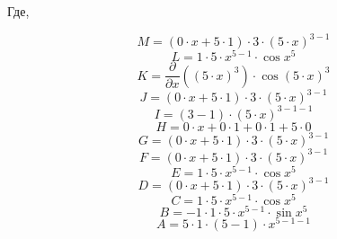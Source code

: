 \documentclass[12pt]{article}
\begin{document}
Где, 

\begin{equation}
	M = 
\left( 0\cdot x + 5\cdot 1\right) \cdot 3\cdot \left( 5\cdot x\right) ^{3 - 1}
\end{equation}
\begin{equation}
	L = 
1\cdot 5\cdot x^{5 - 1}\cdot \cos {x^{5}}
\end{equation}
\begin{equation}
	K = 
\frac{\partial}{\partial x}\left( \left( 5\cdot x\right) ^{3}\right) \cdot \cos {\left( 5\cdot x\right) ^{3}}
\end{equation}
\begin{equation}
	J = 
\left( 0\cdot x + 5\cdot 1\right) \cdot 3\cdot \left( 5\cdot x\right) ^{3 - 1}
\end{equation}
\begin{equation}
	I = 
\left( 3 - 1\right) \cdot \left( 5\cdot x\right) ^{3 - 1 - 1}
\end{equation}
\begin{equation}
	H = 
0\cdot x + 0\cdot 1 + 0\cdot 1 + 5\cdot 0
\end{equation}
\begin{equation}
	G = 
\left( 0\cdot x + 5\cdot 1\right) \cdot 3\cdot \left( 5\cdot x\right) ^{3 - 1}
\end{equation}
\begin{equation}
	F = 
\left( 0\cdot x + 5\cdot 1\right) \cdot 3\cdot \left( 5\cdot x\right) ^{3 - 1}
\end{equation}
\begin{equation}
	E = 
1\cdot 5\cdot x^{5 - 1}\cdot \cos {x^{5}}
\end{equation}
\begin{equation}
	D = 
\left( 0\cdot x + 5\cdot 1\right) \cdot 3\cdot \left( 5\cdot x\right) ^{3 - 1}
\end{equation}
\begin{equation}
	C = 
1\cdot 5\cdot x^{5 - 1}\cdot \cos {x^{5}}
\end{equation}
\begin{equation}
	B = 
-1\cdot 1\cdot 5\cdot x^{5 - 1}\cdot \sin {x^{5}}
\end{equation}
\begin{equation}
	A = 
5\cdot 1\cdot \left( 5 - 1\right) \cdot x^{5 - 1 - 1}
\end{equation}
\end{document}
